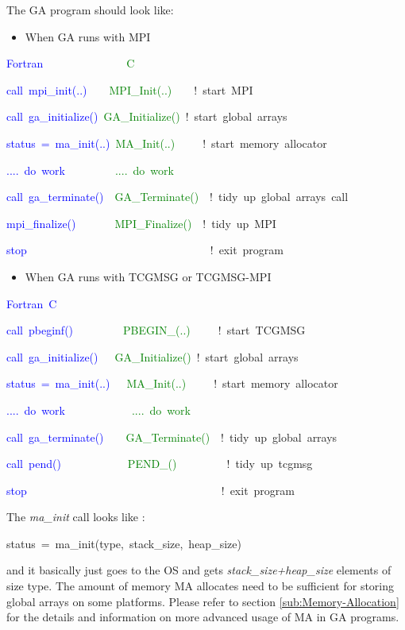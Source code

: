 The GA program should look like:
\begin{itemize}
\item When GA runs with MPI\end{itemize}
\begin{lyxcode}
\textcolor{blue}{Fortran~}~~~~~~~~~~~~~~\textcolor{green}{C}

\textcolor{blue}{call~mpi\_init(..)~}~~~\textcolor{green}{MPI\_Init(..)~}~~~!~start~MPI~

\textcolor{blue}{call~ga\_initialize()}~\textcolor{green}{GA\_Initialize()~}!~start~global~arrays~

\textcolor{blue}{status~=~ma\_init(..)}~\textcolor{green}{MA\_Init(..)~}~~~~!~start~memory~allocator

\textcolor{blue}{....~do~work~~}~~~~~~~\textcolor{green}{....~do~work}

\textcolor{blue}{call~ga\_terminate()}~~\textcolor{green}{GA\_Terminate()~}~!~tidy~up~global~arrays~call

\textcolor{blue}{mpi\_finalize()}~~~~~~~\textcolor{green}{MPI\_Finalize()}~~!~tidy~up~MPI~~

\textcolor{blue}{stop}~~~~~~~~~~~~~~~~~~~~~~~~~~~~~~~~~!~exit~program\end{lyxcode}
\begin{itemize}
\item When GA runs with TCGMSG or TCGMSG-MPI\end{itemize}
\begin{lyxcode}
\textcolor{blue}{Fortran~C}

\textcolor{blue}{call~pbeginf()~}~~~~~~~~\textcolor{green}{PBEGIN\_(..)~}~~~~!~start~TCGMSG~

\textcolor{blue}{call~ga\_initialize()}~~~\textcolor{green}{GA\_Initialize()}~!~start~global~arrays~

\textcolor{blue}{status~=~ma\_init(..)}~~~\textcolor{green}{MA\_Init(..)}~~~~~!~start~memory~allocator

\textcolor{blue}{....~do~work~}~~~~~~~~~~~\textcolor{green}{....~do~work}

\textcolor{blue}{call~ga\_terminate()}~~~~\textcolor{green}{GA\_Terminate()~}~!~tidy~up~global~arrays~

\textcolor{blue}{call~pend()}~~~~~~~~~~~~\textcolor{green}{PEND\_()}~~~~~~~~~!~tidy~up~tcgmsg~

\textcolor{blue}{stop~}~~~~~~~~~~~~~~~~~~~~~~~~~~~~~~~~~~!~exit~program~
\end{lyxcode}
The \emph{ma\_init }call looks like :
\begin{lyxcode}
status~=~ma\_init(type,~stack\_size,~heap\_size)
\end{lyxcode}
and it basically just goes to the OS and gets \emph{stack\_size+heap\_size}
elements of size type. The amount of memory MA allocates need to be
sufficient for storing global arrays on some platforms. Please refer
to section \ref{sub:Memory-Allocation} for the details and information
on more advanced usage of MA in GA programs. 


